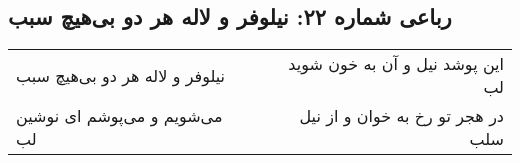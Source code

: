 \begin{center}
\section*{رباعی شماره ۲۲: نیلوفر و لاله هر دو بی‌هیچ سبب}
\label{sec:sh022}
\begin{longtable}{l p{0.5cm} r}
نیلوفر و لاله هر دو بی‌هیچ سبب
&&
این پوشد نیل و آن به خون شوید لب
\\
می‌شویم و می‌پوشم ای نوشین لب
&&
در هجر تو رخ به خوان و از نیل سلب
\\
\end{longtable}
\end{center}
